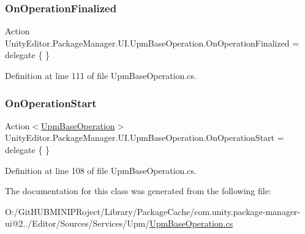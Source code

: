 \mbox{\label{class_unity_editor_1_1_package_manager_1_1_u_i_1_1_upm_base_operation_a29672fd8715a0084d008dc9ec89f17b3}} 
\subsubsection{\texorpdfstring{OnOperationFinalized}{OnOperationFinalized}}
{\footnotesize\ttfamily Action Unity\+Editor.\+Package\+Manager.\+U\+I.\+Upm\+Base\+Operation.\+On\+Operation\+Finalized = delegate \{ \}}



Definition at line 111 of file Upm\+Base\+Operation.\+cs.

\mbox{\label{class_unity_editor_1_1_package_manager_1_1_u_i_1_1_upm_base_operation_a7d5501ef1cff8562b55b86b29ddd91b9}} 
\subsubsection{\texorpdfstring{OnOperationStart}{OnOperationStart}}
{\footnotesize\ttfamily Action$<$\mbox{\hyperlink{class_unity_editor_1_1_package_manager_1_1_u_i_1_1_upm_base_operation}{Upm\+Base\+Operation}}$>$ Unity\+Editor.\+Package\+Manager.\+U\+I.\+Upm\+Base\+Operation.\+On\+Operation\+Start = delegate \{ \}\hspace{0.3cm}{\ttfamily [static]}}



Definition at line 108 of file Upm\+Base\+Operation.\+cs.



The documentation for this class was generated from the following file\+:\begin{DoxyCompactItemize}
\item 
O\+:/\+Git\+H\+U\+B\+M\+I\+N\+I\+P\+Roject/\+Library/\+Package\+Cache/com.\+unity.\+package-\/manager-\/ui@2../\+Editor/\+Sources/\+Services/\+Upm/\mbox{\hyperlink{_upm_base_operation_8cs}{Upm\+Base\+Operation.\+cs}}\end{DoxyCompactItemize}
